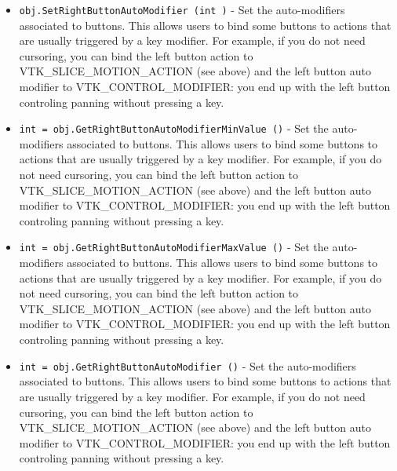 \begin{itemize}
\item  \verb|obj.SetRightButtonAutoModifier (int )| -  Set the auto-modifiers associated to buttons.
 This allows users to bind some buttons to actions that are usually
 triggered by a key modifier. For example, if you do not need cursoring,
 you can bind the left button action to VTK\_SLICE\_MOTION\_ACTION (see above) 
 and the left button auto modifier to VTK\_CONTROL\_MODIFIER: you end up with
 the left button controling panning without pressing a key.

\item  \verb|int = obj.GetRightButtonAutoModifierMinValue ()| -  Set the auto-modifiers associated to buttons.
 This allows users to bind some buttons to actions that are usually
 triggered by a key modifier. For example, if you do not need cursoring,
 you can bind the left button action to VTK\_SLICE\_MOTION\_ACTION (see above) 
 and the left button auto modifier to VTK\_CONTROL\_MODIFIER: you end up with
 the left button controling panning without pressing a key.

\item  \verb|int = obj.GetRightButtonAutoModifierMaxValue ()| -  Set the auto-modifiers associated to buttons.
 This allows users to bind some buttons to actions that are usually
 triggered by a key modifier. For example, if you do not need cursoring,
 you can bind the left button action to VTK\_SLICE\_MOTION\_ACTION (see above) 
 and the left button auto modifier to VTK\_CONTROL\_MODIFIER: you end up with
 the left button controling panning without pressing a key.

\item  \verb|int = obj.GetRightButtonAutoModifier ()| -  Set the auto-modifiers associated to buttons.
 This allows users to bind some buttons to actions that are usually
 triggered by a key modifier. For example, if you do not need cursoring,
 you can bind the left button action to VTK\_SLICE\_MOTION\_ACTION (see above) 
 and the left button auto modifier to VTK\_CONTROL\_MODIFIER: you end up with
 the left button controling panning without pressing a key.

\end{itemize}
